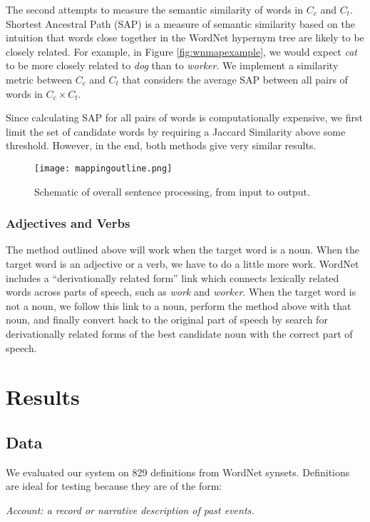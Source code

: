 \documentclass[12pt]{article}
\begin{document}
The second attempts to measure the semantic similarity of words in $C_c$ and $C_t$. Shortest Ancestral Path (SAP) is a measure of semantic similarity based on the intuition that words close together in the WordNet hypernym tree are likely to be closely related. For example, in Figure \ref{fig:wnmapexample}, we would expect \emph{cat} to be more closely related to \emph{dog} than to \emph{worker}. We implement a similarity metric between $C_c$ and $C_t$ that considers the average SAP between all pairs of words in $C_c \times C_t$.

Since calculating SAP for all pairs of words is computationally expensive, we first limit the set of candidate words by requiring a Jaccard Similarity above some threshold. However, in the end, both methods give very similar results.

\begin{figure}[h]
	\centering
	\texttt{[image: mappingoutline.png]}
	\caption{Schematic of overall sentence processing, from input to output.}
	\label{fig:mapoutline}
\end{figure}

\subsubsection{Adjectives and Verbs}

The method outlined above will work when the target word is a noun. When the target word is an adjective or a verb, we have to do a little more work. WordNet includes a ``derivationally related form'' link which connects lexically related words across parts of speech, such as \emph{work} and \emph{worker}. When the target word is not a noun, we follow this link to a noun, perform the method above with that noun, and finally convert back to the original part of speech by search for derivationally related forms of the best candidate noun with the correct part of speech.

\section{Results}

\subsection{Data}
We evaluated our system on 829 definitions from WordNet synsets. Definitions are ideal for testing because they are of the form:

\begin{center}
    \emph{Account: a record or narrative description of past events.}
\end{center}
\end{document}
